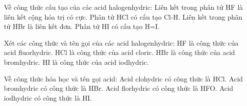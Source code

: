 \documentclass[Main.tex]{subfiles}
\begin{document}
    \begin{ex}
    Về công thức cấu tạo của các acid halogenhydric:
    \choiceTF
    {\True Liên kết trong phân tử HF là liên kết cộng hóa trị có cực.}
    {Phân tử HCl có cấu tạo Cl-H.}
    {\True Liên kết trong phân tử HBr là liên kết đơn.}
    {Phân tử HI có cấu tạo H=I.}
    \end{ex}
    
    \begin{ex}
    Xét các công thức và tên gọi của các acid halogenhydric:
    \choiceTF
    {\True HF là công thức của acid fluorhydric.}
    {HCl là công thức của acid cloric.}
    {\True HBr là công thức của acid bromhydric.}
    {\True HI là công thức của acid iodhydric.}
    \end{ex}
    
    \begin{ex}
    Về công thức hóa học và tên gọi acid:
    \choiceTF
    {\True Acid clohydric có công thức là HCl.}
    {\True Acid bromhydric có công thức là HBr.}
    {Acid florhydric có công thức là HFO.}
    {\True Acid iodhydric có công thức là HI.}
    \end{ex}
    
\end{document}
